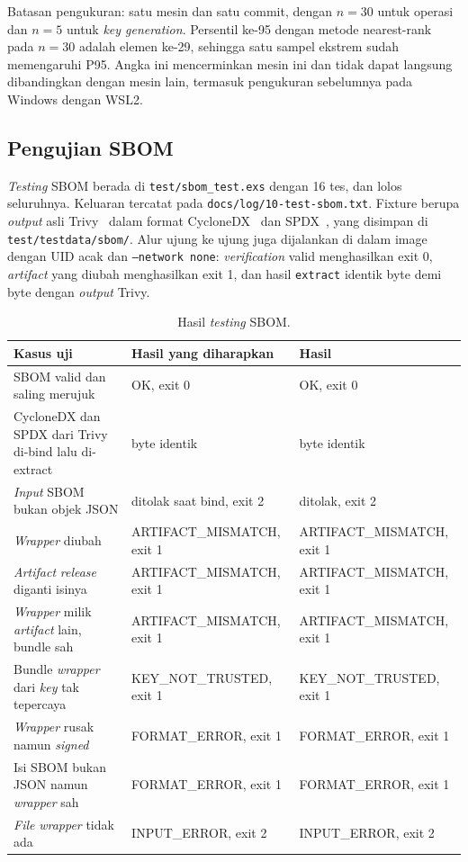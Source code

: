 Batasan pengukuran: satu mesin dan satu commit, dengan $n = 30$ untuk operasi dan $n = 5$ untuk
\textit{key generation}. Persentil ke-95 dengan metode nearest-rank pada $n = 30$ adalah elemen
ke-29, sehingga satu sampel ekstrem sudah memengaruhi P95. Angka ini mencerminkan mesin ini dan
tidak dapat langsung dibandingkan dengan mesin lain, termasuk pengukuran sebelumnya pada Windows
dengan WSL2.

\subsection{Pengujian SBOM}
\textit{Testing} SBOM berada di \texttt{test/sbom\_test.exs} dengan 16 tes, dan lolos seluruhnya. Keluaran tercatat pada \texttt{docs/log/10-test-sbom.txt}.
Fixture berupa \textit{output} asli Trivy~\cite{trivy} dalam format CycloneDX~\cite{cyclonedx} dan SPDX~\cite{spdx}, yang disimpan di
\texttt{test/testdata/sbom/}. Alur ujung ke ujung juga dijalankan di dalam image dengan UID acak
dan \texttt{--network none}: \textit{verification} valid menghasilkan exit 0, \textit{artifact} yang diubah
menghasilkan exit 1, dan hasil \texttt{extract} identik byte demi byte dengan \textit{output} Trivy.

\begin{table}[H]
\centering
{\small
\begin{tabular}{@{}p{5.0cm}p{5.0cm}p{4.9cm}@{}}
\toprule
Kasus uji & Hasil yang diharapkan & Hasil \\
\midrule
SBOM valid dan saling merujuk & OK, exit 0 & OK, exit 0 \\
CycloneDX dan SPDX dari Trivy di-bind lalu di-extract & byte identik & byte identik \\
\textit{Input} SBOM bukan objek JSON & ditolak saat bind, exit 2 & ditolak, exit 2 \\
\textit{Wrapper} diubah & ARTIFACT\_MISMATCH, exit 1 & ARTIFACT\_MISMATCH, exit 1 \\
\textit{Artifact} \textit{release} diganti isinya & ARTIFACT\_MISMATCH, exit 1 & ARTIFACT\_MISMATCH, exit 1 \\
\textit{Wrapper} milik \textit{artifact} lain, bundle sah & ARTIFACT\_MISMATCH, exit 1 & ARTIFACT\_MISMATCH, exit 1 \\
Bundle \textit{wrapper} dari \textit{key} tak tepercaya & KEY\_NOT\_TRUSTED, exit 1 & KEY\_NOT\_TRUSTED, exit 1 \\
\textit{Wrapper} rusak namun \textit{signed} & FORMAT\_ERROR, exit 1 & FORMAT\_ERROR, exit 1 \\
Isi SBOM bukan JSON namun \textit{wrapper} sah & FORMAT\_ERROR, exit 1 & FORMAT\_ERROR, exit 1 \\
\textit{File} \textit{wrapper} tidak ada & INPUT\_ERROR, exit 2 & INPUT\_ERROR, exit 2 \\
\bottomrule
\end{tabular}}
\caption{Hasil \textit{testing} SBOM.}
\end{table}

\fussy
